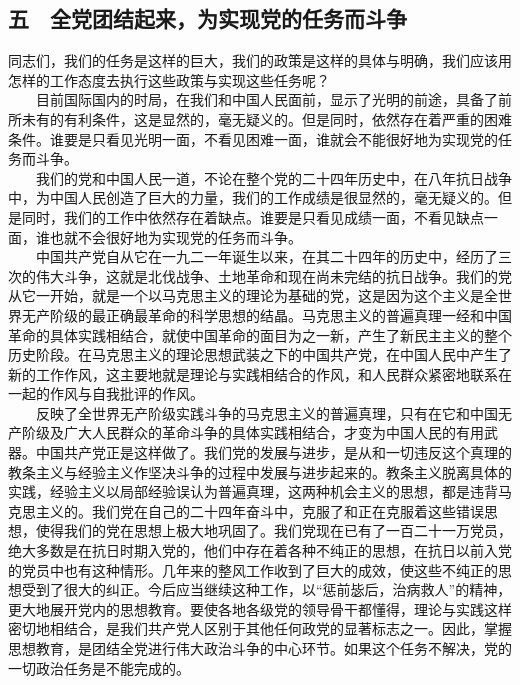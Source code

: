 \documentclass[cn,11pt,chinese]{elegantbook}
\def\myformat#1{\hfil\hfil #1}
\begin{document}
\subsection*{\myformat{五　全党团结起来，为实现党的任务而斗争}}
同志们，我们的任务是这样的巨大，我们的政策是这样的具体与明确，我们应该用怎样的工作态度去执行这些政策与实现这些任务呢？\\
　　目前国际国内的时局，在我们和中国人民面前，显示了光明的前途，具备了前所未有的有利条件，这是显然的，毫无疑义的。但是同时，依然存在着严重的困难条件。谁要是只看见光明一面，不看见困难一面，谁就会不能很好地为实现党的任务而斗争。\\
　　我们的党和中国人民一道，不论在整个党的二十四年历史中，在八年抗日战争中，为中国人民创造了巨大的力量，我们的工作成绩是很显然的，毫无疑义的。但是同时，我们的工作中依然存在着缺点。谁要是只看见成绩一面，不看见缺点一面，谁也就不会很好地为实现党的任务而斗争。\\
　　中国共产党自从它在一九二一年诞生以来，在其二十四年的历史中，经历了三次的伟大斗争，这就是北伐战争、土地革命和现在尚未完结的抗日战争。我们的党从它一开始，就是一个以马克思主义的理论为基础的党，这是因为这个主义是全世界无产阶级的最正确最革命的科学思想的结晶。马克思主义的普遍真理一经和中国革命的具体实践相结合，就使中国革命的面目为之一新，产生了新民主主义的整个历史阶段。在马克思主义的理论思想武装之下的中国共产党，在中国人民中产生了新的工作作风，这主要地就是理论与实践相结合的作风，和人民群众紧密地联系在一起的作风与自我批评的作风。\\
　　反映了全世界无产阶级实践斗争的马克思主义的普遍真理，只有在它和中国无产阶级及广大人民群众的革命斗争的具体实践相结合，才变为中国人民的有用武器。中国共产党正是这样做了。我们党的发展与进步，是从和一切违反这个真理的教条主义与经验主义作坚决斗争的过程中发展与进步起来的。教条主义脱离具体的实践，经验主义以局部经验误认为普遍真理，这两种机会主义的思想，都是违背马克思主义的。我们党在自己的二十四年奋斗中，克服了和正在克服着这些错误思想，使得我们的党在思想上极大地巩固了。我们党现在已有了一百二十一万党员，绝大多数是在抗日时期入党的，他们中存在着各种不纯正的思想，在抗日以前入党的党员中也有这种情形。几年来的整风工作收到了巨大的成效，使这些不纯正的思想受到了很大的纠正。今后应当继续这种工作，以“惩前毖后，治病救人”的精神，更大地展开党内的思想教育。要使各地各级党的领导骨干都懂得，理论与实践这样密切地相结合，是我们共产党人区别于其他任何政党的显著标志之一。因此，掌握思想教育，是团结全党进行伟大政治斗争的中心环节。如果这个任务不解决，党的一切政治任务是不能完成的。\\
\end{document}
